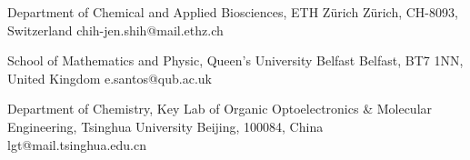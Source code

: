 
\begin{cvrefs}
  {Department of Chemical and Applied Biosciences, ETH Z\"{u}rich}
  {Z\"{u}rich, CH-8093, Switzerland}
  {chih-jen.shih@mail.ethz.ch}
  {}

  {School of Mathematics and Physic, Queen's University Belfast}
  {Belfast, BT7 1NN, United Kingdom}
  {e.santos@qub.ac.uk}
  {}

  {Department of Chemistry, Key Lab of Organic Optoelectronics \& Molecular Engineering, Tsinghua University}
  {Beijing, 100084, China}
  {lgt@mail.tsinghua.edu.cn}
  {}

  
\end{cvrefs}


